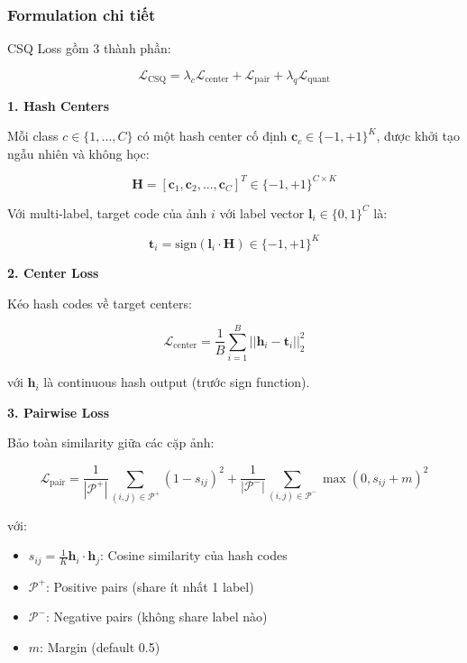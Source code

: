 \documentclass[12pt,a4paper]{article}
\begin{document}
\subsubsection{Formulation chi tiết}

CSQ Loss gồm 3 thành phần:

\begin{equation}
    \mathcal{L}_{\text{CSQ}} = \lambda_c \mathcal{L}_{\text{center}} + \mathcal{L}_{\text{pair}} + \lambda_q \mathcal{L}_{\text{quant}}
\end{equation}

\textbf{1. Hash Centers}

Mỗi class $c \in \{1, ..., C\}$ có một hash center cố định $\mathbf{c}_c \in \{-1, +1\}^K$, được khởi tạo ngẫu nhiên và không học:

\begin{equation}
    \mathbf{H} = [\mathbf{c}_1, \mathbf{c}_2, ..., \mathbf{c}_C]^T \in \{-1, +1\}^{C \times K}
\end{equation}

Với multi-label, target code của ảnh $i$ với label vector $\mathbf{l}_i \in \{0, 1\}^C$ là:

\begin{equation}
    \mathbf{t}_i = \text{sign}(\mathbf{l}_i \cdot \mathbf{H}) \in \{-1, +1\}^K
\end{equation}

\textbf{2. Center Loss}

Kéo hash codes về target centers:

\begin{equation}
    \mathcal{L}_{\text{center}} = \frac{1}{B} \sum_{i=1}^{B} ||\mathbf{h}_i - \mathbf{t}_i||_2^2
\end{equation}

với $\mathbf{h}_i$ là continuous hash output (trước sign function).

\textbf{3. Pairwise Loss}

Bảo toàn similarity giữa các cặp ảnh:

\begin{equation}
    \mathcal{L}_{\text{pair}} = \frac{1}{|\mathcal{P}^+|} \sum_{(i,j) \in \mathcal{P}^+} (1 - s_{ij})^2 + \frac{1}{|\mathcal{P}^-|} \sum_{(i,j) \in \mathcal{P}^-} \max(0, s_{ij} + m)^2
\end{equation}

với:
\begin{itemize}
    \item $s_{ij} = \frac{1}{K}\mathbf{h}_i \cdot \mathbf{h}_j$: Cosine similarity của hash codes
    \item $\mathcal{P}^+$: Positive pairs (share ít nhất 1 label)
    \item $\mathcal{P}^-$: Negative pairs (không share label nào)
    \item $m$: Margin (default 0.5)
\end{itemize}
\end{document}
